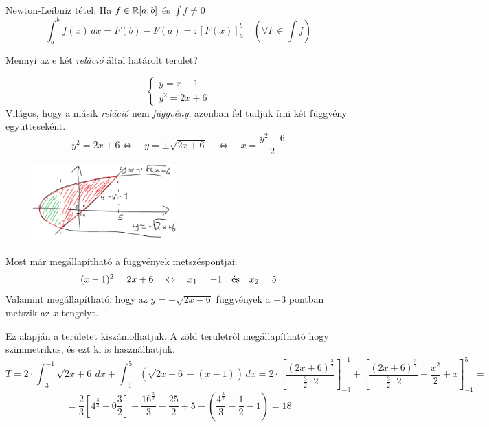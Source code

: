 \documentclass[a4paper,11.5pt]{article}
\begin{document}
		
	\begin{revision}
		Newton-Leibniz tétel: Ha $f\in\mathbb{R}[a,b]$ és $\int f\not=0$ 
			\[ \int_a^bf(x)\,dx=F(b)-F(a)=:[F(x)]_a^b\quad (\forall F\in\int f) \]
	\end{revision}
	\begin{example}
		Mennyi az e két \textit{reláció} által határolt terület?
			
		\[\begin{cases}
			y=x-1\\
			y^2=2x+6
		\end{cases}\]
		Világos, hogy a másik \textit{reláció} nem \textit{függvény}, azonban fel tudjuk írni két függvény együtteseként.
		\[y^2=2x+6\Leftrightarrow\quad y=\pm\sqrt{2x+6}\quad \Leftrightarrow\quad x=\frac{y^2-6}{2} \]
		\begin{figure}[H]
			\centering
			\includegraphics[height=3cm]{../2zh/kepek/08.png}
			\caption{}
		\end{figure}
		Most már megállapítható a függvények metszéspontjai:
		\[ (x-1)^2=2x+6\quad \Leftrightarrow\quad x_1=-1\quad \text{és\quad } x_2=5 \]
		Valamint megállapítható, hogy az $y=\pm\sqrt{2x-6}$ függvények a $-3$ pontban metszik az $x$ tengelyt.
		\smallskip
		
		Ez alapján a területet kiszámolhatjuk. A zöld területről megállapítható hogy szimmetrikus, és ezt ki is használhatjuk.
		\[ T=2\cdot\int_{-3}^{-1}\sqrt{2x+6}\,dx+\int_{-1}^{5}\left(\sqrt{2x+6}-(x-1)\right)\,dx=2\cdot\left[\frac{(2x+6)^{\frac{3}{2}}}{\frac{3}{2}\cdot2}\right]_{-3}^{-1}+\left[\frac{(2x+6)^{\frac{3}{2}}}{\frac{3}{2}\cdot2}-\frac{x^2}{2}+x\right]^{5}_{-1}=\]
		\[=\frac{2}{3}\left[4^\frac{3}{2}-0\frac{3}{2}\right]+\frac{16^\frac{3}{2}}{3}-\frac{25}{2}+5-\left(\frac{4^\frac{3}{2}}{3}-\frac{1}{2}-1\right)=18  \]
	\end{example}
\end{document}
